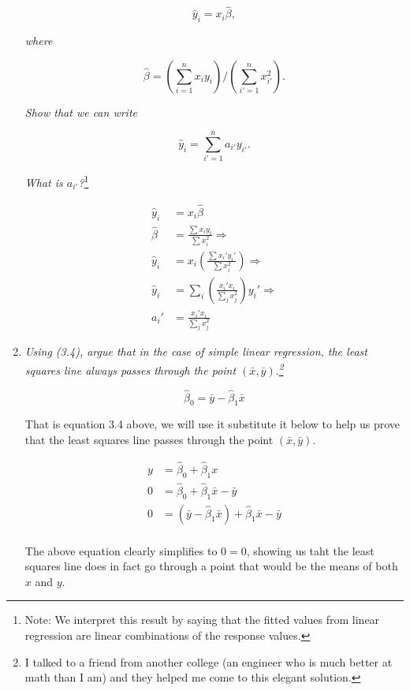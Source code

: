 \documentclass[11pt]{article}
\begin{document}
\begin{enumerate}
	$$ \hat{y}_i = x_i\hat{\beta},$$
	
	\textit{where}
	
	$$ \hat{\beta} = \left(\sum_{i=1}^nx_iy_i\right) / \left(\sum_{i'=1}^nx_{i'}^2\right).$$
	
	
	\textit{Show that we can write}
	
	$$ \hat{y}_i = \sum_{i'=1}^na_{i'}y_{i'}.$$
	
	\textit{What is $a_{i'}$?}\footnote{Note: We interpret this result by saying that the fitted values from linear regression are linear combinations of the response values.}

    \begin{align*}
        \hat{y}_i &= x_i\hat{\beta} \\
        \hat{\beta} &= \frac{\sum x_i y_i}{\sum x_i^2} \Rightarrow \\
        \hat{y}_i &= x_i \left(\frac{\sum x_i' y_i'}{\sum x_i^2}\right) \Rightarrow \\
        \hat{y}_i &= \sum_i\left(\frac{x_i'x_i}{\sum_jx_j^2}\right) y_i' \Longrightarrow \\
        a_i' &= \frac{x_i'x_i}{\sum_j x_j^2}
    \end{align*}

    
	
	\item \textit{Using (3.4), argue that in the case of simple linear regression, the
least squares line always passes through the point $(\bar{x}, \bar{y}).$\footnote{I talked to a friend from another college (an engineer who is much better at math than I am) and they helped me come to this elegant solution.}}
    

        \begin{equation} \tag{3.4}
            \hat{\beta}_0 = \bar{y} - \hat{\beta}_1 \bar{x}
        \end{equation}

    That is equation 3.4 above, we will use it substitute it below to help us prove that the least squares line passes through the point $(\bar{x}, \bar{y}).$ 

    \begin{align*}
        y &= \hat{\beta}_0 + \hat{\beta}_1 x \\
        0 &= \hat{\beta}_0 + \hat{\beta}_1 \bar{x} - \bar{y} \\
        0 &= (\bar{y} - \hat{\beta}_1 \bar{x}) + \hat{\beta}_1 \bar{x} - \bar{y} \\
    \end{align*}

    The above equation clearly simplifies to $0=0$, showing us taht the least squares line does in fact go through a point that would be the means of both $x$ and $y$.
	
\end{enumerate}
\end{document}
